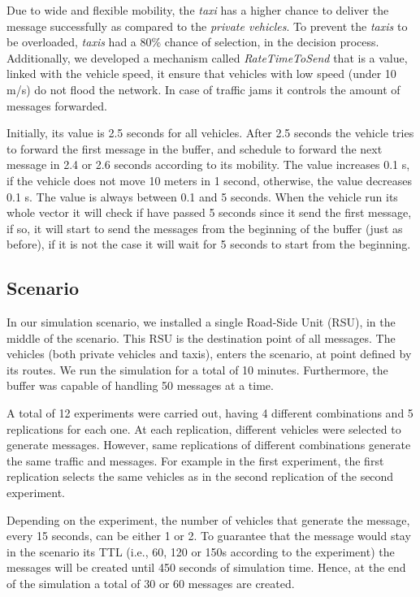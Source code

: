 \documentclass[letterpaper, 10 pt, conference]{ieeeconf}  %
\begin{document}
Due to wide and flexible mobility, the \emph{taxi} has a higher chance to deliver the message successfully as compared to the \emph{private vehicles}. To prevent the \emph{taxis} to be overloaded, \emph{taxis} had a 80\% chance of selection, in the decision process. Additionally, we developed a mechanism called \emph{RateTimeToSend} that is a value, linked with the vehicle speed, it ensure that vehicles with low speed (under 10 m/s) do not flood the network. In case of traffic jams it controls the amount of messages forwarded.

Initially, its value is 2.5 seconds for all vehicles. After 2.5 seconds the vehicle tries to forward the first message in the buffer, and schedule to forward the next message in 2.4 or 2.6 seconds according to its mobility. The value increases 0.1 s, if the vehicle does not move 10 meters in 1 second, otherwise, the value decreases 0.1 s. The value is always between 0.1 and 5 seconds. When the vehicle run its whole vector it will check if have passed 5 seconds since it send the first message, if so, it will start to send the messages from the beginning of the buffer (just as before), if it is not the case it will wait for 5 seconds to start from the beginning.

\subsection{Scenario}

In our simulation scenario, we installed a single Road-Side Unit (RSU), in the middle of the scenario. This RSU is the destination point of all messages. The vehicles (both private vehicles  and taxis), enters the scenario, at point defined by its routes. We run the simulation for a total of 10 minutes. Furthermore, the buffer was capable of handling 50 messages at a time.

A total of 12 experiments were carried out, having 4 different combinations and 5 replications for each one. At each replication, different vehicles were selected to generate messages. However, same replications of different combinations generate the same traffic and messages. For example in the first experiment, the first replication selects the same vehicles as in the second replication of the second experiment.

Depending on the experiment, the number of vehicles that generate the message, every 15 seconds, can be either 1 or 2. To guarantee that the message would stay in the scenario its TTL (i.e., 60, 120 or 150s according to the experiment) the messages will be created until 450 seconds of simulation time. Hence, at the end of the simulation a total of 30 or 60 messages are created.
\end{document}
